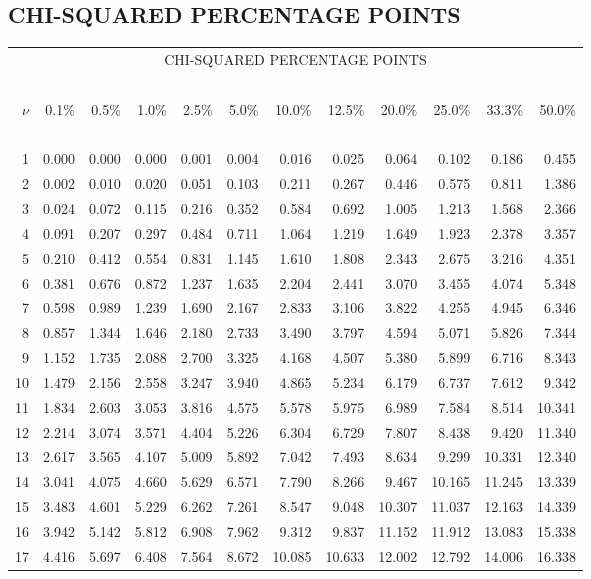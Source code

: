 \subsection{CHI-SQUARED PERCENTAGE POINTS}
{\small
\begin{center}
\begin{tabular}
      {r@{\ }r@{\ }r@{\ }r@{\ }r@{\ }r@{\ }r@{\ }r@{\ }r@{\ }r@{\ }r@{\ }r}
\multicolumn{12}{c}{CHI-SQUARED PERCENTAGE POINTS}\\
\ \\
$\nu$&0.1\%&0.5\%&1.0\%&2.5\%&5.0\%&10.0\%&12.5\%&20.0\%&25.0\%&33.3\%&50.0\%\\
\ \\
 1&0.000&0.000&0.000&0.001&0.004&0.016&0.025&0.064&0.102&0.186&0.455\\
 2&0.002&0.010&0.020&0.051&0.103&0.211&0.267&0.446&0.575&0.811&1.386\\
 3&0.024&0.072&0.115&0.216&0.352&0.584&0.692&1.005&1.213&1.568&2.366\\
 4&0.091&0.207&0.297&0.484&0.711&1.064&1.219&1.649&1.923&2.378&3.357\\
 5&0.210&0.412&0.554&0.831&1.145&1.610&1.808&2.343&2.675&3.216&4.351\\
 6&0.381&0.676&0.872&1.237&1.635&2.204&2.441&3.070&3.455&4.074&5.348\\
 7&0.598&0.989&1.239&1.690&2.167&2.833&3.106&3.822&4.255&4.945&6.346\\
 8&0.857&1.344&1.646&2.180&2.733&3.490&3.797&4.594&5.071&5.826&7.344\\
 9&1.152&1.735&2.088&2.700&3.325&4.168&4.507&5.380&5.899&6.716&8.343\\
10&1.479&2.156&2.558&3.247&3.940&4.865&5.234&6.179&6.737&7.612&9.342\\
11&1.834&2.603&3.053&3.816&4.575&5.578&5.975&6.989&7.584&8.514&10.341\\
12&2.214&3.074&3.571&4.404&5.226&6.304&6.729&7.807&8.438&9.420&11.340\\
13&2.617&3.565&4.107&5.009&5.892&7.042&7.493&8.634&9.299&10.331&12.340\\
14&3.041&4.075&4.660&5.629&6.571&7.790&8.266&9.467&10.165&11.245&13.339\\
15&3.483&4.601&5.229&6.262&7.261&8.547&9.048&10.307&11.037&12.163&14.339\\
16&3.942&5.142&5.812&6.908&7.962&9.312&9.837&11.152&11.912&13.083&15.338\\
17&4.416&5.697&6.408&7.564&8.672&10.085&10.633&12.002&12.792&14.006&16.338\\

\end{tabular}
\end{center}}

